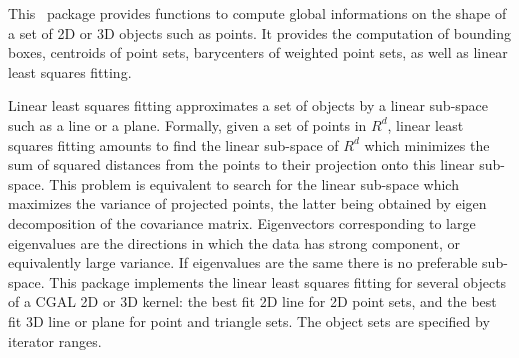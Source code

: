 This \cgal\ package provides functions to compute global informations
on the shape of a set of 2D or 3D objects such as points. It provides the computation of bounding boxes, centroids of point sets, barycenters of weighted point sets, as well as linear least squares fitting.

Linear least squares fitting approximates a set of objects by a linear
sub-space such as a line or a plane.
Formally, given a set of points in $R^d$, linear least squares fitting amounts
to find the linear sub-space of $R^d$ which minimizes the sum of squared
distances from the points to their projection onto this linear sub-space. This
problem is equivalent to search for the linear sub-space which maximizes the
variance of projected points, the latter being obtained by eigen decomposition
of the covariance matrix. Eigenvectors corresponding to large eigenvalues are
the directions in which the data has strong component, or equivalently large
variance. If eigenvalues are the same there is no preferable sub-space.
This package implements the linear least squares fitting for
several objects of a CGAL 2D or 3D kernel: the best fit 2D line for 2D
point sets, and the best fit 3D line or plane for point and
triangle sets. The object sets are specified by iterator ranges.

